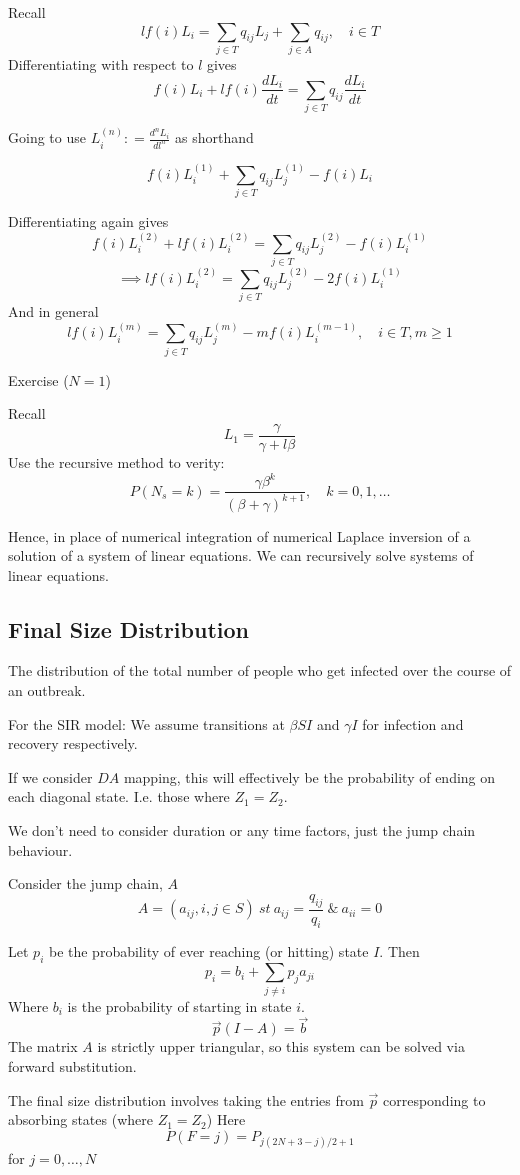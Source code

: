 \documentclass{X:/Documents/Coding/Latex/myassignment}
\begin{document}
Recall
\[l f(i) L_i = \sum_{j\in T} q_{ij} L_j + \sum_{j\in A} q_{ij}, \quad i\in T\]
Differentiating with respect to $l$ gives
\[f(i) L_i + l f(i) \frac{dL_i}{dt} = \sum_{j\in T} q_{ij} \frac{dL_i}{dt}\]

Going to use $L_i^{(n)} : = \frac{d^n L_i}{dl^n}$ as shorthand

\[f(i) L_i^{(1)} + \sum_{j\in T} q_{ij} L_j^{(1)} - f(i) L_i\]

Differentiating again gives
\[f(i) L_i^{(2)} + l f(i) L_i^{(2)} = \sum_{j\in T} q_{ij} L_j^{(2)} - f(i)L_i^{(1)}\]
\[\implies lf(i) L_i^{(2)} = \sum_{j\in T} q_{ij} L_j^{(2)} - 2f(i) L_i^{(1)}\]
And in general
\[l f(i) L_i^{(m)} = \sum_{j\in T} q_{ij} L_j^{(m)} - m f(i) L_i^{(m-1)}, \quad i \in T, m \geq 1\]


Exercise ($N=1$)

Recall
\[L_1 = \frac{\gamma}{\gamma + l \beta}\]
Use the recursive method to verity:
\[P(N_s = k) = \frac{\gamma \beta^k}{(\beta+\gamma)^{k+1}}, \quad k=0,1,\hdots\]


Hence, in place of numerical integration of numerical Laplace inversion of a solution of a system of linear equations. We can recursively solve systems of linear equations.


\subsection{Final Size Distribution}
The distribution of the total number of people who get infected over the course of an outbreak.

For the SIR model:
We assume transitions at $\beta SI$ and $\gamma I$ for infection and recovery respectively.

If we consider $DA$ mapping, this will effectively be the probability of ending on each diagonal state.
I.e. those where $Z_1 = Z_2$.

We don't need to consider duration or any time factors, just the jump chain behaviour.

Consider the jump chain, $A$
\[A = \left(a_{ij}, i,j \in S\right) \ st \ a_{ij} = \frac{q_{ij}}{q_{i}} \ \& \ a_{ii} = 0\]

Let $p_i$ be the probability of ever reaching (or hitting) state $I$. Then
\[p_i = b_i + \sum_{j\neq i} p_j a_{ji}\]
Where $b_i$ is the probability of starting in state $i$.
\[\vec p (I-A) = \vec b \]
The matrix $A$ is strictly upper triangular, so this system can be solved via forward substitution.

The final size distribution involves taking the entries from $\vec p$ corresponding to absorbing states (where $Z_1=Z_2$)
Here
\[P(F=j) = P_{j(2N+3-j)/2 +1}\]
for $j=0,\hdots,N$
\end{document}
